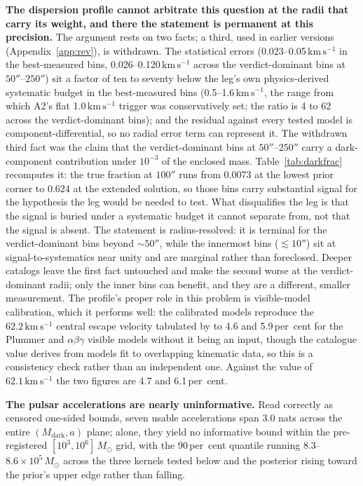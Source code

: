 \documentclass[11pt]{article}
\newcommand{\msun}{\ensuremath{M_\odot}}
\newcommand{\mdark}{\ensuremath{M_{\mathrm{dark}}}}
\newcommand{\kms}{\ensuremath{\mathrm{km\,s^{-1}}}}
\begin{document}
\textbf{The dispersion profile cannot arbitrate this question at the radii that carry its weight, and there the statement is permanent at this precision.} The argument rests on two facts; a third, used in earlier versions (Appendix~\ref{app:rev}), is withdrawn. The statistical errors (0.023--0.05\,\kms{} in the best-measured bins, 0.026--0.120\,\kms{} across the verdict-dominant bins at $50''$--$250''$) sit a factor of ten to seventy below the leg's own physics-derived systematic budget in the best-measured bins (0.5--1.6\,\kms{}, the range from which A2's flat 1.0\,\kms{} trigger was conservatively set; the ratio is 4 to 62 across the verdict-dominant bins); and the residual against every tested model is component-differential, so no radial error term can represent it. The withdrawn third fact was the claim that the verdict-dominant bins at $50''$--$250''$ carry a dark-component contribution under $10^{-3}$ of the enclosed mass. Table~\ref{tab:darkfrac} recomputes it: the true fraction at $100''$ runs from 0.0073 at the lowest prior corner to 0.624 at the extended solution, so those bins carry substantial signal for the hypothesis the leg would be needed to test. What disqualifies the leg is that the signal is buried under a systematic budget it cannot separate from, not that the signal is absent. The statement is radius-resolved: it is terminal for the verdict-dominant bins beyond $\sim 50''$, while the innermost bins ($\lesssim 10''$) sit at signal-to-systematics near unity and are marginal rather than foreclosed. Deeper catalogs leave the first fact untouched and make the second worse at the verdict-dominant radii; only the inner bins can benefit, and they are a different, smaller measurement. The profile's proper role in this problem is visible-model calibration, which it performs well: the calibrated models reproduce the $62.2\,\kms$ central escape velocity tabulated by \citet{Yin2024} to 4.6 and 5.9\,per~cent for the Plummer and $\alpha\beta\gamma$ visible models without it being an input, though the catalogue value derives from models fit to overlapping kinematic data, so this is a consistency check rather than an independent one. Against the \citet{BaumgardtHilker2018} value of $62.1\,\kms$ the two figures are 4.7 and 6.1\,per~cent.

\textbf{The pulsar accelerations are nearly uninformative.} Read correctly as censored one-sided bounds, seven usable accelerations span 3.0 nats across the entire $(\mdark, a)$ plane; alone, they yield no informative bound within the pre-registered $[10^{3}, 10^{6}]\,\msun$ grid, with the 90\,per~cent quantile running $8.3$--$8.6\times10^{5}\,\msun$ across the three kernels tested below and the posterior rising toward the prior's upper edge rather than falling.
\end{document}
